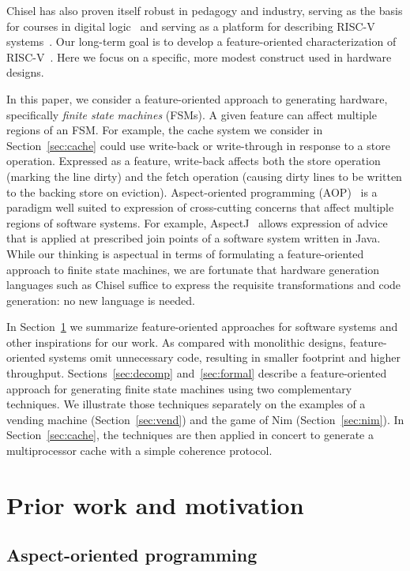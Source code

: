 \documentclass[sigplan,anonymous,review]{acmart}
\begin{document}
Chisel has also proven itself robust in pedagogy and industry, serving as the basis for courses in digital logic~\cite{vlsicourse} and serving as a platform for describing RISC-V systems~\cite{chisel:riscv}.  Our long-term goal is to develop a feature-oriented characterization of RISC-V~\cite{riscv}.  Here we focus on a specific, more modest construct used in hardware designs.

In this paper, we consider a feature-oriented approach to generating hardware, specifically \emph{finite state machines} (FSMs). A given feature can affect multiple regions of an FSM. For example, the cache system  we consider in Section~\ref{sec:cache} could use write-back or write-through in response to a store operation. Expressed as a feature, write-back affects both the store operation (marking the line dirty) and the fetch operation (causing dirty lines to be written to the backing store on eviction). Aspect-oriented programming (AOP)~\cite{gregor:97} is a paradigm well suited to expression of cross-cutting concerns that affect multiple regions of software systems. For example, AspectJ~\cite{aspectj} allows expression of advice that is applied at prescribed join points of a software system written in Java. While our thinking is aspectual in terms of formulating a feature-oriented approach to finite state machines, we are fortunate that hardware generation languages such as Chisel suffice to express the requisite transformations and code generation:  no new language is needed.

In Section~\ref{sec:prior} we summarize feature-oriented approaches for software systems and other inspirations for our work. As compared with monolithic designs, feature-oriented systems omit unnecessary code, resulting in smaller footprint and higher throughput.
Sections~\ref{sec:decomp} and~\ref{sec:formal} describe a feature-oriented approach for generating finite state machines using two complementary techniques. We illustrate those techniques separately on the examples of a vending machine (Section~\ref{sec:vend}) and the game of Nim (Section~\ref{sec:nim}). In Section~\ref{sec:cache}, the techniques are then applied in concert to generate a multiprocessor cache with a simple coherence protocol.

\section{Prior work and motivation}\label{sec:prior}

\subsection{Aspect-oriented programming}
\end{document}
